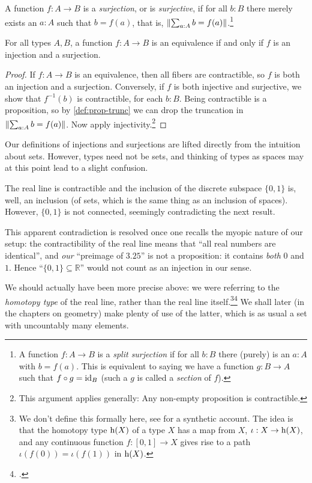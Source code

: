 \begin{definition}\label{def:surjection}
A function $f:A\to B$ is a \emph{surjection}, or is \emph{surjective},
if for all $b:B$ there merely exists an $a:A$ such that $b=f(a)$,
that is, $\lVert\sum_{a:A} b=f(a)\rVert$.\footnote{%
  A function $f:A\to B$ is a \emph{split surjection}
  if for all $b:B$ there (purely) is an $a:A$ with $b=f(a)$.
  This is equivalent to saying we have a function
  $g:B\to A$ such that $f\circ g = \mathord{\mathrm{id}}_B$
  (such a $g$ is called a \emph{section} of $f$).}
\end{definition}


\begin{lemma}\label{lem:inj+surj}
For all types $A,B$, a function $f: A\to B$ is an equivalence
if and only if $f$ is an injection and a surjection.
\end{lemma}

\begin{proof}
If $f: A\to B$ is an equivalence, then all fibers are contractible,
so $f$ is both an injection and a surjection. Conversely,
if $f$ is both injective and surjective, we show that
$f^{-1}(b)$ is contractible, for each $b:B$.
Being contractible is a proposition, so by \cref{def:prop-trunc}
we can drop the truncation in $\lVert\sum_{a:A} b=f(a)\rVert$.
Now apply injectivity.\footnote{%
  This argument applies generally:
  Any non-empty proposition is contractible.}
\end{proof}
\begin{remark}
  \label{rem:injectionsurjectionisnotwhatyouthink}
  Our definitions of injections and surjections are lifted directly from the intuition about sets.  However, types need not be sets, and thinking of types as spaces may at this point lead to a slight confusion.

The real line is contractible and the inclusion of the discrete subspace $\{0,1\}$ is, well, an inclusion (of sets, which is the same thing as an inclusion of spaces).  However, $\{0,1\}$ is not connected, seemingly contradicting the next result.

  This apparent contradiction is resolved once one recalls the myopic nature of our setup: the contractibility of the real line means that ``all real numbers are identical'', and \emph{our} ``preimage of $3.25$'' is not a proposition: it contains \emph{both} $0$ and $1$.  Hence ``$\{0,1\}\subseteq\mathbb R$'' would not count as an injection in our sense.

  We should actually have been more precise above: we were referring to the \emph{homotopy type} of the real line, rather than the real line itself.\footnote{\label{ft:cohesive}%
    We don't define this formally here,
    see \citeauthor{Shulman-Real-Cohesive}\footnotemark{} for a synthetic account.
    The idea is that the homotopy type $\mathrm{h}(X)$ of a type $X$
    has a map from $X$, $\iota : X \to \mathrm{h}(X)$,
    and any continuous function $f : [0,1] \to X$
    gives rise to a path
    $\iota(f(0)) = \iota(f(1))$ in
    $\mathrm{h}(X)$.}\footcitetext{Shulman-Real-Cohesive}
  We shall later (in the chapters on geometry) make plenty of use of the latter,
  which is as usual a set with uncountably many elements.
\end{remark}

